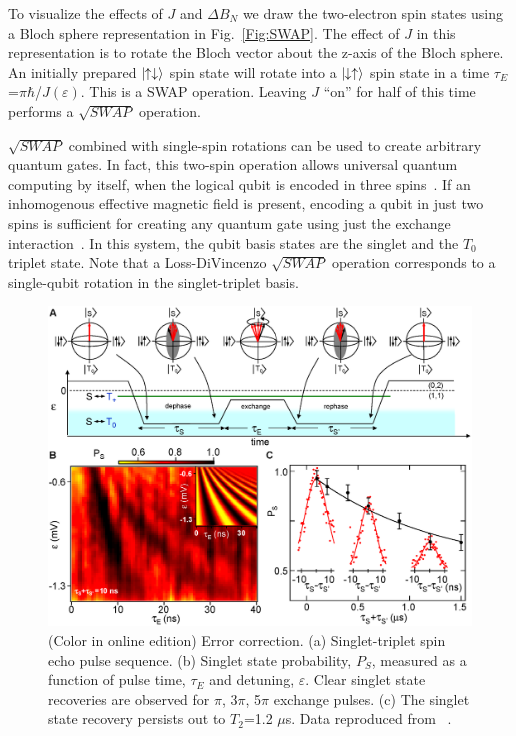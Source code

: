 \documentclass[rmp,twocolumn,aps]{revtex4}
\begin{document}
To visualize the effects of $J$ and $\Delta B_{N}$ we draw the two-electron spin states
using a Bloch sphere representation in Fig.\ \ref{Fig:SWAP}. The
effect of $J$ in this representation is to
rotate the Bloch vector about the z-axis of the Bloch sphere. An
initially prepared $|\!\!\uparrow\downarrow \rangle$ spin state
will rotate into a $|\!\!\downarrow\uparrow \rangle$ spin state in
a time $\tau_E$=$\pi$$\hbar$/$J(\varepsilon)$. This is a SWAP
operation. Leaving $J$ ``on'' for half of this time performs a $\sqrt{SWAP}$ operation. 

$\sqrt{SWAP}$ combined with single-spin rotations can be used to create arbitrary quantum gates. In fact, this two-spin operation allows universal quantum computing by itself, when the logical qubit is encoded in three spins~\cite{DiVincenzoNature2000}. If an inhomogenous effective magnetic field is present, encoding a qubit in just two spins is sufficient for creating any quantum gate using just the exchange interaction~\cite{Levy}. In this system, the qubit basis states are the singlet and the $T_0$ triplet state. Note that a Loss-DiVincenzo $\sqrt{SWAP}$ operation corresponds to a single-qubit rotation in the singlet-triplet basis.

\begin{figure}[ht]
\includegraphics[width=14cm]{hanson_fig49.eps}
\caption{(Color in online edition) Error correction. (a) Singlet-triplet spin echo pulse
sequence. (b) Singlet state probability, $P_{S}$, measured as a
function of pulse time, $\tau_{E}$ and detuning,
$\varepsilon$. Clear singlet state recoveries are observed for $\pi$,
3$\pi$, 5$\pi$ exchange pulses. (c) The singlet state recovery
persists out to $T_2$=1.2 $\mu$s. Data
reproduced from ~\textcite{petta05}.} \label{Fig:Echo}
\end{figure}
\end{document}
